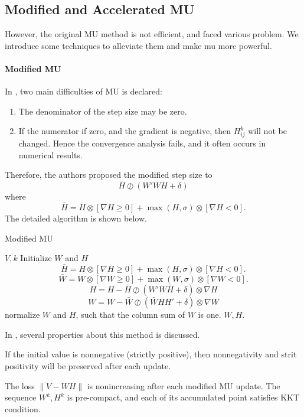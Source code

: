 \documentclass{article}
\renewcommand{\grad}{\nabla}
\begin{document}
\subsection{Modified and Accelerated MU}
However, the original MU method is not efficient, and faced various problem.  We introduce some techniques to alleviate them and make mu more powerful.
\paragraph{Modified MU}
In \cite{mumod}, two main difficulties of MU is declared:
\begin{enumerate}
	\item The denominator of the step size may be zero.
	\item If the numerator if zero, and the gradient is negative, then $H_{ij}^k$ will not be changed. Hence the convergence analysis fails, and it often occurs in numerical results.
\end{enumerate}
Therefore, the authors proposed the modified step size to 
$$\bar H\oslash(W'WH+\delta)$$
where $$\bar H = H\otimes [\grad H \ge 0 ] + \max(H,\sigma) \otimes  [\grad H < 0 ].$$
The detailed algorithm is shown below.

\begin{algorithm}[H]
	\caption{Modified MU}
	\begin{algorithmic}[1]
		\REQUIRE $V, k$
		\STATE Initialize $W$ and $H$ 
		\STATE $$\bar H = H\otimes [\grad H \ge 0 ] + \max(H,\sigma) \otimes  [\grad H < 0 ].$$
		\STATE$$\bar W = W\otimes [\grad W \ge 0 ] + \max(W,\sigma) \otimes  [\grad W < 0 ].$$
		\STATE $$ H= H - \bar H\oslash(W'W\bar H+\delta)\otimes \grad H$$
		\STATE $$W = W - \bar W \oslash (\bar WHH' + \delta)\otimes \grad W$$
		\STATE normalize $W$ and $H$, such that the column sum of $W$ is one.
		\ENDWHILE
		\STATE \Return $W,H$.
	\end{algorithmic}
\end{algorithm}
In \cite{mumod}, several properties about this method is discussed.

\begin{proposition}
	If the initial value is nonnegative (strictly positive), then nonnegativity and strit positivity will be preserved after each update.
\end{proposition}

\begin{proposition}
	The loss $\|V-WH\|$ is nonincreasing after each modified MU update. The sequence $W^k, H^k$ is pre-compact, and each of its accumulated point satisfies KKT condition.
\end{proposition}
\end{document}
